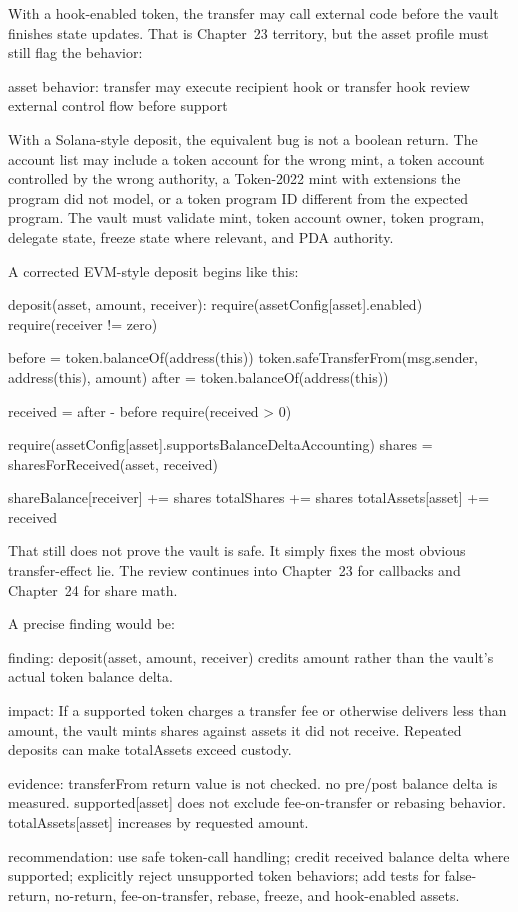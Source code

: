 With a hook-enabled token, the transfer may call external code before the vault finishes state updates. That is Chapter~23 territory, but the asset profile must still flag the behavior:

\begin{codeblock}
asset behavior:
    transfer may execute recipient hook or transfer hook
    review external control flow before support
\end{codeblock}

With a Solana-style deposit, the equivalent bug is not a boolean return. The account list may include a token account for the wrong mint, a token account controlled by the wrong authority, a Token-2022 mint with extensions the program did not model, or a token program ID different from the expected program. The vault must validate mint, token account owner, token program, delegate state, freeze state where relevant, and PDA authority.

A corrected EVM-style deposit begins like this:

\begin{codeblock}
deposit(asset, amount, receiver):
    require(assetConfig[asset].enabled)
    require(receiver != zero)

    before = token.balanceOf(address(this))
    token.safeTransferFrom(msg.sender, address(this), amount)
    after = token.balanceOf(address(this))

    received = after - before
    require(received > 0)

    require(assetConfig[asset].supportsBalanceDeltaAccounting)
    shares = sharesForReceived(asset, received)

    shareBalance[receiver] += shares
    totalShares += shares
    totalAssets[asset] += received
\end{codeblock}

That still does not prove the vault is safe. It simply fixes the most obvious transfer-effect lie. The review continues into Chapter~23 for callbacks and Chapter~24 for share math.

A precise finding would be:

\begin{codeblock}
finding:
    deposit(asset, amount, receiver) credits amount rather than
    the vault's actual token balance delta.

impact:
    If a supported token charges a transfer fee or otherwise delivers
    less than amount, the vault mints shares against assets it did not receive.
    Repeated deposits can make totalAssets exceed custody.

evidence:
    transferFrom return value is not checked.
    no pre/post balance delta is measured.
    supported[asset] does not exclude fee-on-transfer or rebasing behavior.
    totalAssets[asset] increases by requested amount.

recommendation:
    use safe token-call handling;
    credit received balance delta where supported;
    explicitly reject unsupported token behaviors;
    add tests for false-return, no-return, fee-on-transfer, rebase,
    freeze, and hook-enabled assets.
\end{codeblock}

